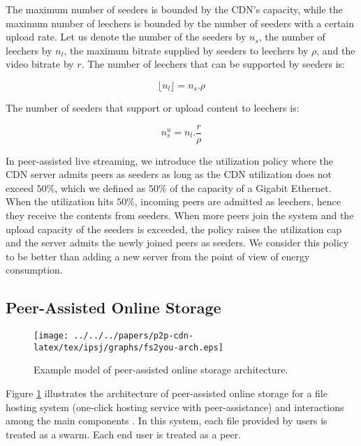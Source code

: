 The maximum number of seeders is bounded by the CDN's capacity, while the maximum number of leechers is bounded by the number of seeders with a certain upload rate.
Let us denote the number of the seeders by $n_s$, the number of leechers by $n_l$, the maximum bitrate supplied by seeders to leechers by $\rho$, and the video bitrate by $r$. 
The number of leechers that can be supported by seeders is:

\begin{equation}\label{eqn:leecher}
	\lfloor n_l \rfloor = n_s . \rho
\end{equation}

The number of seeders that support or upload content to leechers is:

\begin{equation}\label{eqn:seeders-to-leechers}
	n_{s}^{u} = n_l . \frac{r}{\rho}
\end{equation}

In peer-assisted live streaming, we introduce the utilization policy where the CDN server admits peers as seeders as long as the CDN utilization does not exceed $50$\%, which we defined as $50$\% of the capacity of a Gigabit Ethernet. 
When the utilization hits $50$\%, incoming peers are admitted as leechers, hence they receive the contents from seeders. 
When more peers join the system and the upload capacity of the seeders is exceeded, the policy raises the utilization cap and the server admits the newly joined peers as seeders. 
We consider this policy to be better than adding a new server from the point of view of energy consumption.

\subsection{Peer-Assisted Online Storage}

\begin{figure}[thb]
\begin{center}
\texttt{[image: ../../../papers/p2p-cdn-latex/tex/ipsj/graphs/fs2you-arch.eps]}
\end{center}
\caption{Example model of peer-assisted online storage architecture.}
\label{fig:fs2you-arch}
\end{figure} 

Figure \ref{fig:fs2you-arch} illustrates the architecture of peer-assisted online storage for a file hosting system (one-click hosting service with peer-assistance) and interactions among the main components \cite{5061997}. 
In this system, each file provided by users is treated as a swarm. Each end user is treated as a peer.

